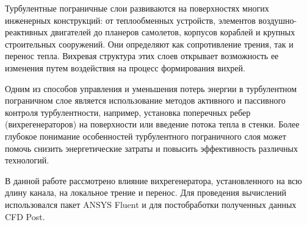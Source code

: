 	Турбулентные пограничные слои развиваются на поверхностях многих инженерных конструкций: от теплообменных устройств, элементов воздушно-реактивных двигателей до планеров самолетов, корпусов кораблей и крупных строительных сооружений. Они определяют как сопротивление трения, так и перенос тепла. Вихревая структура этих слоев открывает возможность ее изменения путем воздействия на процесс формирования вихрей. 
	
	Одним из способов управления и уменьшения потерь энергии в турбулентном пограничном слое является использование методов активного и пассивного контроля турбулентности, например, установка поперечных ребер (вихрегенераторов) на поверхности или введение потока тепла в стенки. Более глубокое понимание особенностей турбулентного пограничного слоя может помочь снизить энергетические затраты и повысить эффективность различных технологий.
	
	В данной работе рассмотрено влияние вихрегенератора, установленного на всю длину канала, на локальное трение и перенос. Для проведения вычислений использовался пакет ANSYS Fluent и для постобработки полученных данных CFD Post.
\newpage